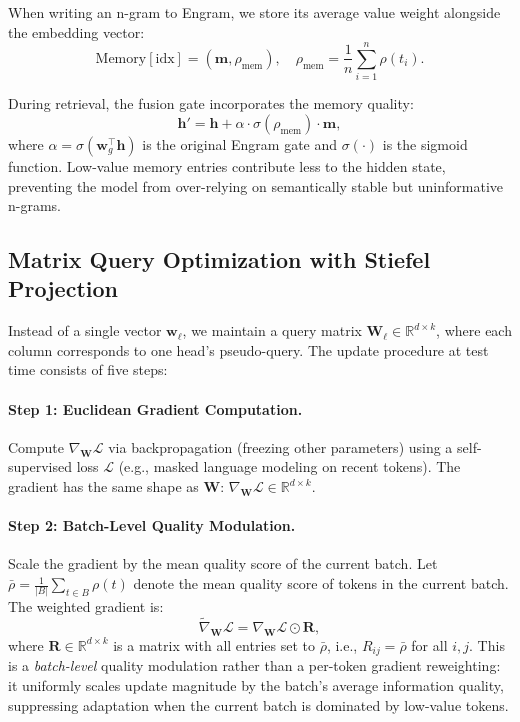 \documentclass[twocolumn]{article}
\begin{document}
When writing an n-gram to Engram, we store its average value weight alongside the embedding vector:
\begin{equation}
\mathrm{Memory}[\mathrm{idx}] = (\mathbf{m}, \rho_{\mathrm{mem}}), \quad \rho_{\mathrm{mem}} = \frac{1}{n} \sum_{i=1}^{n} \rho(t_i).
\end{equation}

During retrieval, the fusion gate incorporates the memory quality:
\begin{equation}
\mathbf{h}' = \mathbf{h} + \alpha \cdot \sigma(\rho_{\mathrm{mem}}) \cdot \mathbf{m},
\label{eq:value-weighted-engram}
\end{equation}
where $\alpha = \sigma(\mathbf{w}_g^\top \mathbf{h})$ is the original Engram gate and $\sigma(\cdot)$ is the sigmoid function. Low-value memory entries contribute less to the hidden state, preventing the model from over-relying on semantically stable but uninformative n-grams.

\subsection{Matrix Query Optimization with Stiefel Projection}
\label{sec:qasp-matrix}

Instead of a single vector $\mathbf{w}_\ell$, we maintain a query matrix $\mathbf{W}_\ell \in \mathbb{R}^{d \times k}$, where each column corresponds to one head's pseudo-query. The update procedure at test time consists of five steps:

\paragraph{Step 1: Euclidean Gradient Computation.}
Compute $\nabla_{\mathbf{W}} \mathcal{L}$ via backpropagation (freezing other parameters) using a self-supervised loss $\mathcal{L}$ (e.g., masked language modeling on recent tokens). The gradient has the same shape as $\mathbf{W}$: $\nabla_{\mathbf{W}} \mathcal{L} \in \mathbb{R}^{d \times k}$.

\paragraph{Step 2: Batch-Level Quality Modulation.}
Scale the gradient by the mean quality score of the current batch. Let $\bar{\rho} = \frac{1}{|B|} \sum_{t \in B} \rho(t)$ denote the mean quality score of tokens in the current batch. The weighted gradient is:
\begin{equation}
\widetilde{\nabla}_{\mathbf{W}} \mathcal{L} = \nabla_{\mathbf{W}} \mathcal{L} \odot \mathbf{R},
\label{eq:weighted-gradient}
\end{equation}
where $\mathbf{R} \in \mathbb{R}^{d \times k}$ is a matrix with all entries set to $\bar{\rho}$, i.e., $R_{ij} = \bar{\rho}$ for all $i, j$. This is a \emph{batch-level} quality modulation rather than a per-token gradient reweighting: it uniformly scales update magnitude by the batch's average information quality, suppressing adaptation when the current batch is dominated by low-value tokens.
\end{document}
